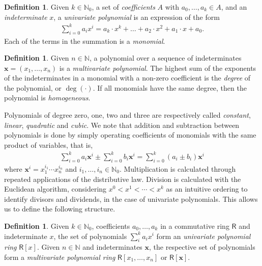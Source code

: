 \documentclass[12pt, a4paper, oneside]{memoir}
\theoremstyle{definition}
\newtheorem{definition}[theorem]{Definition}
\begin{document}
\begin{definition}
  Given $k \in \mathbb{N}_{0}$, a set of \emph{coefficients} $A$ with $a_{0}, \dots, a_{k} \in A$, and an \emph{indeterminate} $x$, a \emph{univariate polynomial} is an expression of the form
  \begin{align}
    \sum_{i = 0}^{k} a_{i} x^{i} 
      = a_{k} \cdot x^{k} + \dots + a_{2} \cdot x^{2} + a_{1} \cdot x + a_{0}.
  \end{align}
  Each of the terms in the summation is a \emph{monomial}.
\end{definition}

\begin{definition}
  Given $n \in \mathbb{N}$, a polynomial over a sequence of indeterminates $\mathbf{x} = (x_{1}, \dots, x_{n})$ is a \emph{multivariate polynomial}. The highest sum of the exponents of the indeterminates in a monomial with a non-zero coefficient is the \emph{degree} of the polynomial, or $\deg(\cdot)$. If all monomials have the same degree, then the polynomial is \emph{homogeneous}.
\end{definition}

Polynomials of degree zero, one, two and three are respectively called \emph{constant}, \emph{linear}, \emph{quadratic} and \emph{cubic}. We note that addition and subtraction between polynomials is done by simply operating coefficients of monomials with the same product of variables, that is,
\begin{align}
  \sum_{i = 0}^{k} a_{i} \mathbf{x}^{i} \pm \sum_{i = 0}^{k} b_{i} \mathbf{x}^{i} = \sum_{i = 0}^{k} (a_{i} \pm b_{i}) \mathbf{x}^{i}
\end{align}
where $\mathbf{x}^{i} = x_{1}^{i_{1}} \cdots x_{n}^{i_{n}}$ and $i_{1}, \dots, i_{n} \in \mathbb{N}_{0}$. Multiplication is calculated through repeated applications of the distributive law. Division is calculated with the Euclidean algorithm, considering $x^{0} < x^{1} < \cdots < x^{k}$ as an intuitive ordering to identify divisors and dividends, in the case of univariate polynomials. This allows us to define the following structure.

\begin{definition}
  Given $k \in \mathbb{N}_{0}$, coefficients $a_{0}, \dots, a_{k}$ in a commutative ring $\mathsf{R}$ and indeterminate $x$, the set of polynomials $\sum_{i}^{k} a_{i} x^{i}$ form an \emph{univariate polynomial ring} $\mathsf{R}[x]$. Given $n \in \mathbb{N}$ and indeterminates $\mathbf{x}$, the respective set of polynomials form a \emph{multivariate polynomial ring} $\mathsf{R}[x_{1}, \dots, x_{n}]$ or $\mathsf{R}[\mathbf{x}]$.
\end{definition}
\end{document}

